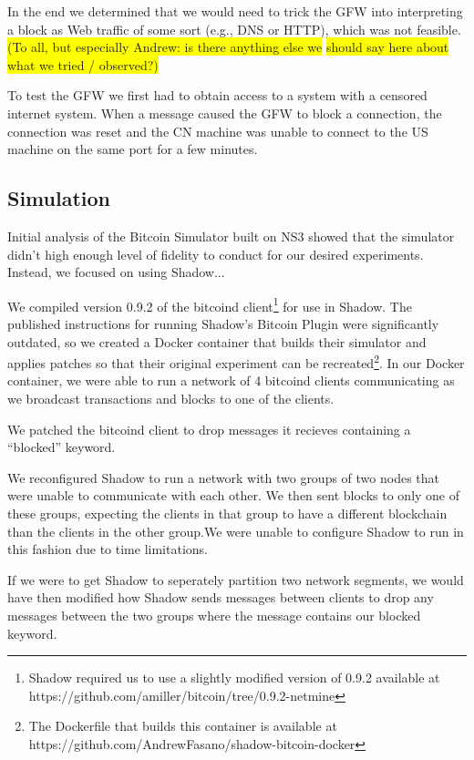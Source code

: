 In the end we determined that we would need to trick the GFW into interpreting a block as Web traffic of some sort (e.g., DNS or HTTP), which was not feasible. \colorbox{yellow}{(To all, but especially Andrew: is there anything else we}
\colorbox{yellow}{should say here about what we tried / observed?)}

To test the GFW we first had to obtain access to a system with a censored internet system. 
When a message caused the GFW to block a connection, the connection was reset and the CN machine was unable to connect to the US machine on the same port for a few minutes.


\subsection{Simulation}
Initial analysis of the Bitcoin Simulator built on NS3 showed that the simulator didn't high enough level of fidelity to conduct for our desired experiments. Instead, we focused on using Shadow...

We compiled version 0.9.2 of the bitcoind client\footnote{Shadow required us to use a slightly modified version of 0.9.2 available at https://github.com/amiller/bitcoin/tree/0.9.2-netmine} for use in Shadow. The published instructions for running Shadow's Bitcoin Plugin were significantly outdated, so we created a Docker container that builds their simulator and applies patches so that their original experiment can be recreated\footnote{The Dockerfile that builds this container is available at https://github.com/AndrewFasano/shadow-bitcoin-docker}. In our Docker container, we were able to run a network of 4 bitcoind clients communicating as we broadcast transactions and blocks to one of the clients.

We patched the bitcoind client to drop messages it recieves containing a ``blocked'' keyword.

We reconfigured Shadow to run a network with two groups of two nodes that were unable to communicate with each other. We then sent blocks to only one of these groups, expecting the clients in that group to have a different blockchain than the clients in the other group.We were unable to configure Shadow to run in this fashion due to time limitations.

If we were to get Shadow to seperately partition two network segments, we would have then modified how Shadow sends messages between clients to drop any messages between the two groups where the message contains our blocked keyword.

